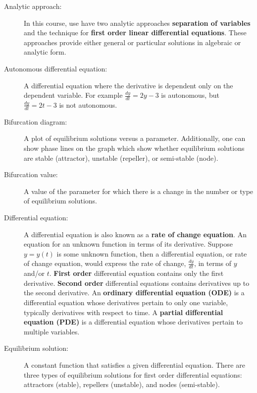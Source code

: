 \pagestyle{fancy}
\setcounter{page}{1}
\lfoot{}
\cfoot{}
\renewcommand{\footrulewidth}{.4pt}
\vspace*{-20pt} \thispagestyle{firstfooter}
\begin{description}
\item[Analytic approach:] In this course, use have two analytic approaches \textbf{separation of variables} and the technique for \textbf{first order linear differential equations}. These approaches provide either general or particular solutions in algebraic or analytic form.
\item[Autonomous differential equation:] A differential equation where the derivative is dependent only on the dependent variable. For example $\frac{dy}{dt}=2y-3$ is autonomous, but $\frac{dy}{dt} = 2t -3$ is not autonomous. 
\item[Bifurcation diagram:] A plot of equilibrium solutions versus a parameter. Additionally, one can show phase lines on the graph which show whether equilibrium solutions are stable (attractor), unstable (repeller), or semi-stable (node).
\item[Bifurcation value:] A value of the parameter for which there is a change in the number or type of equilibrium solutions.
\item[Differential equation:] A differential equation is also known as a \textbf{rate of change equation}. An equation for an unknown function in terms of its derivative. Suppose $y = y(t)$ is some unknown function, then a differential equation, or rate of change equation, would express the rate of change, $\frac{dy}{dt}$, in terms of $y$ and/or $t$. \textbf{First order} differential equation contains only the first derivative. \textbf{Second order} differential equations contains derivatives up to the second derivative. An \textbf{ordinary differential equation (ODE)} is a differential equation whose derivatives pertain to only one variable, typically derivatives with respect to time. A \textbf{partial differential equation (PDE)} is a differential equation whose derivatives pertain to multiple variables.
\item[Equilibrium solution:] A constant function that satisfies a given differential equation. There are three types of equilibrium solutions for first order differential equations: attractors (stable), repellers (unstable), and nodes (semi-stable). 

\end{description}
